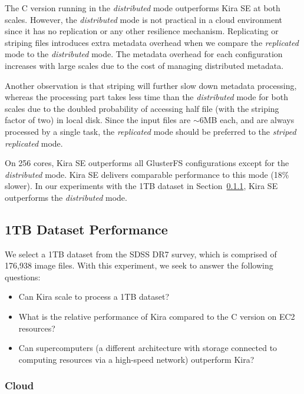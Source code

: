 \documentclass[conference]{IEEEtran}
\begin{document}
The C version running in the \emph{distributed} mode outperforms Kira SE at both scales. 
However, the \emph{distributed} mode is not practical in a cloud environment since
it has no replication or any other resilience mechanism. Replicating or striping
files introduces extra metadata overhead when we compare the \emph{replicated} mode
to the \emph{distributed} mode. The metadata overhead for each configuration increases
with large scales due to the cost of managing distributed metadata.

Another observation is that striping will further slow down metadata processing, whereas the
processing part takes less time than the \emph{distributed} mode for both scales due
to the doubled probability of accessing half file (with the striping factor of two) in local disk.
Since the input files are $\sim$6MB each, and are always processed by a single task, the
\emph{replicated} mode should be preferred to the \emph{striped replicated} mode.

On 256 cores, Kira SE outperforms all GlusterFS configurations except for the \emph{distributed}
mode. Kira SE delivers comparable performance to this mode (18\% slower). In our
experiments with the 1TB dataset in Section~\ref{sec:1TB-EC2}, Kira SE outperforms
the \emph{distributed} mode.

\subsection{1TB Dataset Performance}
\label{sec:Performance-1TB}

We select a 1TB dataset from the SDSS DR7 survey, which is comprised of 176,938 image files. 
With this experiment, we seek to answer the following questions: 

\begin{itemize}
\item Can Kira scale to process a 1TB dataset?
\item What is the relative performance of Kira compared to the C version on EC2 resources?
\item Can supercomputers (a different architecture with storage connected to computing
resources via a high-speed network) outperform Kira?
\end{itemize}

\subsubsection{Cloud}
\label{sec:1TB-EC2}
\end{document}
